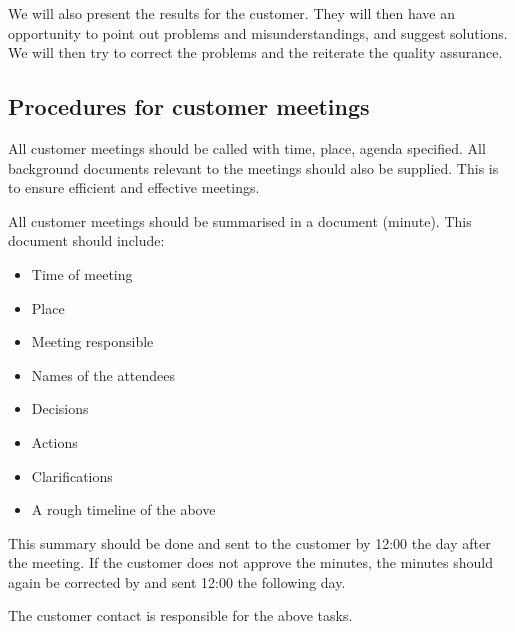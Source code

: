 We will also present the results for the customer. They will then have an opportunity to point out problems and misunderstandings, and suggest solutions. We will then try to correct the problems and the reiterate the quality assurance.

\subsection{Procedures for customer meetings}
All customer meetings should be called with time, place, agenda specified. All background documents relevant to the meetings should also be supplied. This is to ensure efficient and effective meetings.

All customer meetings should be summarised in a document (minute). This document should include:
\begin{itemize}
	\item Time of meeting
	\item Place
	\item Meeting responsible
	\item Names of the attendees
	\item Decisions
	\item Actions
	\item Clarifications
	\item A rough timeline of the above
\end{itemize}

This summary should be done and sent to the customer by 12:00 the day after the meeting. If the customer does not approve the minutes, the minutes should again be corrected by and sent 12:00 the following day.

The customer contact is responsible for the above tasks.

